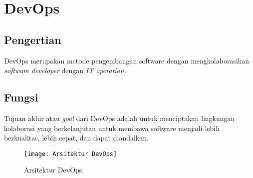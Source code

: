 \chapter{DevOps}

\section{Pengertian}
DevOps merupakan metode pengembangan software dengan mengkolaborasikan \textit{software developer} dengan \textit{IT operation}. 
\section{Fungsi}
Tujuan akhir atau \textit{goal} dari DevOps adalah untuk menciptakan lingkungan kolaborasi yang berkelanjutan untuk membawa software menjadi lebih berkualitas, lebih cepat, dan dapat diandalkan.
\begin{figure}[h]
	\centering
	\texttt{[image: Arsitektur DevOps]}
	\caption{Arsitektur DevOps.}
	\label{fig:Arsitektur DevOps}
\end{figure}
